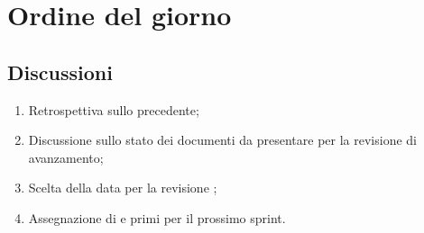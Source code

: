 \section{Ordine del giorno} \label{sec:agenda}
\subsection{Discussioni} \label{subsec:discussione}
\begin{enumerate}
    \item Retrospettiva sullo  precedente;
    \item Discussione sullo stato dei documenti da presentare per la revisione di avanzamento;
    \item Scelta della data per la revisione ;
    \item Assegnazione di  e primi  per il prossimo sprint. 
\end{enumerate}
